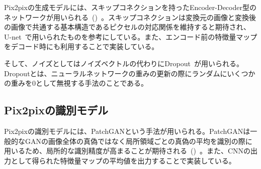 Pix2pixの生成モデルには、スキップコネクションを持ったEncoder-Decoder型のネットワークが用いられる~()~。スキップコネクションは変換元の画像と変換後の画像で共通する基本構造であるピクセルの対応関係を維持すると期待され、U-net~\cite{u-net}で用いられたものを参考にしている。また、エンコード前の特徴量マップをデコード時にも利用することで実装している。

そして、ノイズとしてはノイズベクトルの代わりにDropout~\cite{Dropout}が用いられる。Dropoutとは、ニューラルネットワークの重みの更新の際にランダムにいくつかの重みを0として無視する手法のことである。

\subsection{Pix2pixの識別モデル}

Pix2pixの識別モデルには、PatchGANという手法が用いられる。PatchGANは一般的なGANの画像全体の真偽ではなく局所領域ごとの真偽の平均を識別の際に用いるため、局所的な識別精度が高まることが期待される~()~。また、CNNの出力として得られた特徴量マップの平均値を出力することで実装している。


